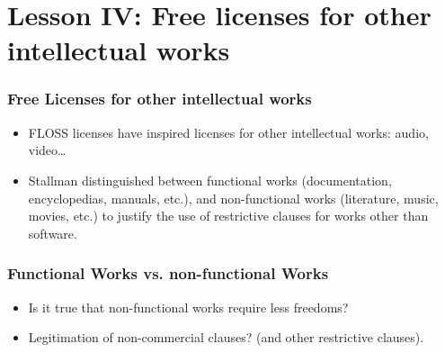 

\section{Lesson IV: Free licenses for other intellectual works}



\begin{frame}
\frametitle{Free Licenses for other intellectual works}

\begin{itemize}
\item FLOSS licenses have inspired licenses for other intellectual
  works: audio, video\ldots 

\item Stallman distinguished between \alert{functional works} (documentation, encyclopedias, manuals, etc.), and \alert{non-functional works} (literature, music, movies, etc.) to justify the use of restrictive clauses for works other than software.\\\pause

\end{itemize}

\end{frame}

\begin{frame}
\frametitle{Functional Works vs. non-functional Works}
\begin{itemize}
\item Is it true that non-functional works require less freedoms? \\\pause

\item Legitimation of non-commercial clauses? (and other restrictive clauses).
\end{itemize}                                                 

\end{frame}


